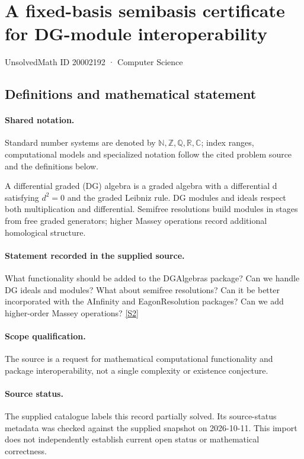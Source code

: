 \documentclass[11pt]{article}
\newcommand{\sref}[2]{\hyperlink{source:#1:#2}{[S#2]}}
\begin{document}
\setcounter{section}{20002191}
\section{A fixed-basis semibasis certificate for DG-module interoperability}\label{20002192}
{\small\sffamily UnsolvedMath ID 20002192 · Computer Science}
\subsection{Definitions and mathematical statement}

\paragraph{Shared notation.}Standard number systems are denoted by $\mathbb N,\mathbb Z,\mathbb Q,\mathbb R,\mathbb C$; index ranges, computational models and specialized notation follow the cited problem source and the definitions below.


A differential graded (DG) algebra is a graded algebra with a differential d satisfying $d^2=0$ and the graded Leibniz rule. DG modules and ideals respect both multiplication and differential. Semifree resolutions build modules in stages from free graded generators; higher Massey operations record additional homological structure.
\paragraph{Statement recorded in the supplied source.}
What functionality should be added to the DGAlgebras package? Can we handle DG ideals and modules? What about semifree resolutions? Can it be better incorporated with the AInfinity and EagonResolution packages? Can we add higher-order Massey operations? \sref{20002192}{2}
\paragraph{Scope qualification.}
The source is a request for mathematical computational functionality and package interoperability, not a single complexity or existence conjecture.
\paragraph{Source status.}
The supplied catalogue labels this record partially solved. Its source-status metadata was checked against the supplied snapshot on 2026-10-11. This import does not independently establish current open status or mathematical correctness.
\end{document}
